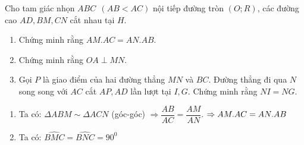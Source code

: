 \begin{ex}%
    Cho tam giác nhọn $ABC~~(AB<AC)$ nội tiếp đường tròn $(O;R)$, các đường cao $AD, BM, CN$ cắt nhau tại $H$.
    \begin{enumerate}
         \item Chứng minh rằng $AM.AC=AN.AB.$
         \item Chứng minh rằng $OA\perp MN$.
         \item Gọi $P$ là giao điểm của hai đường thẳng $MN$ và $BC$. Đường thẳng đi qua $N$ song song với $AC$ cắt $AP,AD$ lần lượt tại $I,G$. Chứng minh rằng $NI=NG$.

    \end{enumerate}
\loigiai
    {\begin{center}
\end{center}
    \begin{enumerate}
        \item Ta có: $\Delta ABM \sim \Delta ACN$ (góc-góc)
        $ \Rightarrow \dfrac{{AB}}{{AC}} = \dfrac{{AM}}{{AN}}.$
        $\Rightarrow AM.AC{\rm{ }} = {\rm{ }}AN.AB$
        \item Ta có: $\widehat {BMC} = \widehat {BNC} = {90}^0$

\end{enumerate}}
\end{ex}
